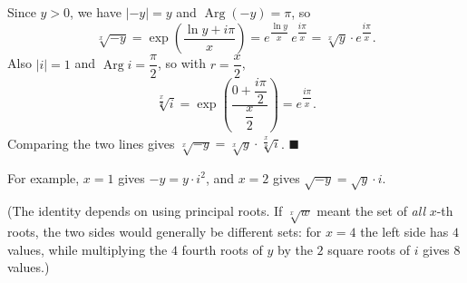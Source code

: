 Since $y>0$, we have $|-y|=y$ and $\operatorname{Arg}(-y)=\pi$, so
\[
\sqrt[x]{-y}=\exp\!\left(\dfrac{\ln y+i\pi}{x}\right)=e^{\dfrac{\ln y}{x}}\,e^{\dfrac{i\pi}{x}}=\sqrt[x]{y}\cdot e^{\dfrac{i\pi}{x}} .
\]
Also $|i|=1$ and $\operatorname{Arg} i=\dfrac{\pi}{2}$, so with $r=\dfrac {x}{2}$,
\[
\sqrt[\dfrac {x}{2}]{i}=\exp\!\left(\dfrac{0+\dfrac{i\pi}{2}}{\dfrac {x}{2}}\right)=e^{\dfrac{i\pi}{x}} .
\]
Comparing the two lines gives $\sqrt[x]{-y}=\sqrt[x]{y}\cdot\sqrt[\dfrac {x}{2}]{i}$. $\blacksquare$

For example, $x=1$ gives $-y=y\cdot i^2$, and $x=2$ gives $\sqrt{-y}=\sqrt y\cdot i$.

(The identity depends on using principal roots. If $\sqrt[x]{w}$ meant the set of \emph{all} $x$-th roots, the two sides would generally be different sets: for $x=4$ the left side has $4$ values, while multiplying the $4$ fourth roots of $y$ by the $2$ square roots of $i$ gives $8$ values.)
